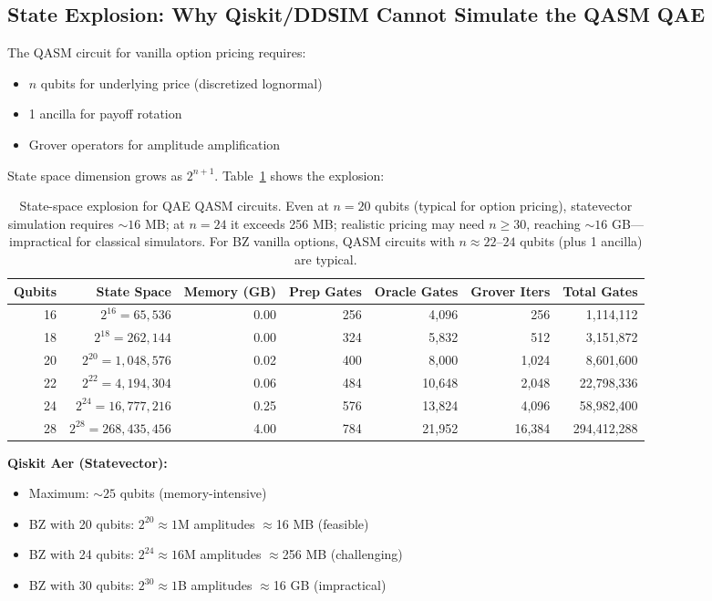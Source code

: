 \documentclass[11pt,a4paper]{article}
\begin{document}
\subsection{State Explosion: Why Qiskit/DDSIM Cannot Simulate the QASM QAE}
The QASM circuit for vanilla option pricing requires:
\begin{itemize}
    \item $n$ qubits for underlying price (discretized lognormal)
    \item 1 ancilla for payoff rotation
    \item Grover operators for amplitude amplification
\end{itemize}

State space dimension grows as $2^{n+1}$. Table~\ref{tab:state_explosion} shows the explosion:

\begin{table}[h]
\centering
\small
\begin{tabular}{rrrrrrr}
\toprule
Qubits & State Space & Memory (GB) & Prep Gates & Oracle Gates & Grover Iters & Total Gates \\
\midrule
16 & $2^{16} = 65{,}536$ & 0.00 & 256 & 4{,}096 & 256 & 1{,}114{,}112 \\
18 & $2^{18} = 262{,}144$ & 0.00 & 324 & 5{,}832 & 512 & 3{,}151{,}872 \\
20 & $2^{20} = 1{,}048{,}576$ & 0.02 & 400 & 8{,}000 & 1{,}024 & 8{,}601{,}600 \\
22 & $2^{22} = 4{,}194{,}304$ & 0.06 & 484 & 10{,}648 & 2{,}048 & 22{,}798{,}336 \\
24 & $2^{24} = 16{,}777{,}216$ & 0.25 & 576 & 13{,}824 & 4{,}096 & 58{,}982{,}400 \\
28 & $2^{28} = 268{,}435{,}456$ & 4.00 & 784 & 21{,}952 & 16{,}384 & 294{,}412{,}288 \\
\bottomrule
\end{tabular}
\caption{State-space explosion for QAE QASM circuits. Even at $n=20$ qubits (typical for option pricing), statevector simulation requires $\sim16$ MB; at $n=24$ it exceeds 256 MB; realistic pricing may need $n\ge 30$, reaching $\sim16$ GB—impractical for classical simulators. For BZ vanilla options, QASM circuits with $n\approx22$–$24$ qubits (plus 1 ancilla) are typical.}
\label{tab:state_explosion}
\end{table}

\textbf{Qiskit Aer (Statevector):}
\begin{itemize}
    \item Maximum: $\sim25$ qubits (memory-intensive)
    \item BZ with 20 qubits: $2^{20}\approx1$M amplitudes $\approx$16 MB (feasible)
    \item BZ with 24 qubits: $2^{24}\approx16$M amplitudes $\approx$256 MB (challenging)
    \item BZ with 30 qubits: $2^{30}\approx1$B amplitudes $\approx$16 GB (impractical)
\end{itemize}
\end{document}

